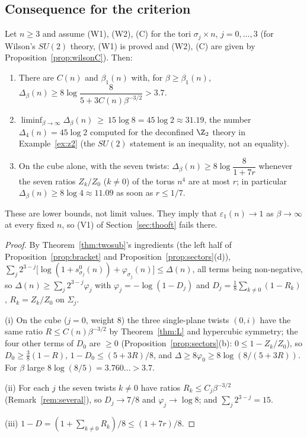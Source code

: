 \subsection{Consequence for the criterion}
\begin{corollary}\label{cor:L1}
Let $n\ge3$ and assume (W1), (W2), (C) for the tori $\sigma_j\times n$, $j=0,\dots,3$ (for Wilson's $SU(2)$ theory, (W1) is proved and (W2), (C) are given by Proposition~\ref{prop:wilsonC}). Then:
\begin{enumerate}
\item[(i)] There are $C(n)$ and $\beta_1(n)$ with, for $\beta\ge\beta_1(n)$, $\Delta_\beta(n)\ge8\log\dfrac{8}{5+3C(n)\beta^{-3/2}}>3.7$.
\item[(ii)] $\displaystyle\liminf_{\beta\to\infty}\Delta_\beta(n)\ \ge\ 15\log8=45\log2\approx31.19$, the number $\Delta_4(n)=45\log2$ computed for the deconfined $\Z_2$ theory in Example~\ref{ex:z2} (the $SU(2)$ statement is an inequality, not an equality).
\item[(iii)] On the cube alone, with the seven twists: $\Delta_\beta(n)\ge8\log\dfrac{8}{1+7r}$ whenever the seven ratios $Z_k/Z_0$ ($k\ne0$) of the torus $n^4$ are at most $r$; in particular $\Delta_\beta(n)\ge8\log4\approx11.09$ as soon as $r\le1/7$.
\end{enumerate}
These are lower bounds, not limit values. They imply that $\varepsilon_1(n)\to1$ as $\beta\to\infty$ at every fixed $n$, so (V1) of Section~\ref{sec:thooft} fails there.
\end{corollary}
\begin{proof}
By Theorem~\ref{thm:twosub}'s ingredients (the left half of Proposition~\ref{prop:bracket} and Proposition~\ref{prop:sectors}(d)), $\sum_j2^{3-j}\bigl[\log(1+s^0_{\sigma_j}(n))+\varphi_{\sigma_j}(n)\bigr]\le\Delta(n)$, all terms being non-negative, so $\Delta(n)\ge\sum_j2^{3-j}\varphi_j$ with $\varphi_j=-\log(1-D_j)$ and $D_j=\frac18\sum_{k\ne0}(1-R_k)$, $R_k=Z_k/Z_0$ on $\Sigma_j$.

(i) On the cube ($j=0$, weight $8$) the three single-plane twists $(0,i)$ have the same ratio $R\le C(n)\beta^{-3/2}$ by Theorem~\ref{thm:L} and hypercubic symmetry; the four other terms of $D_0$ are $\ge0$ (Proposition~\ref{prop:sectors}(b): $0\le1-Z_k/Z_0$), so $D_0\ge\frac38(1-R)$, $1-D_0\le(5+3R)/8$, and $\Delta\ge8\varphi_0\ge8\log(8/(5+3R))$. For $\beta$ large $8\log(8/5)=3.760\ldots>3.7$.

(ii) For each $j$ the seven twists $k\ne0$ have ratios $R_k\le C_j\beta^{-3/2}$ (Remark~\ref{rem:several}), so $D_j\to7/8$ and $\varphi_j\to\log8$; and $\sum_j2^{3-j}=15$.

(iii) $1-D=(1+\sum_{k\ne0}R_k)/8\le(1+7r)/8$.
\end{proof}
